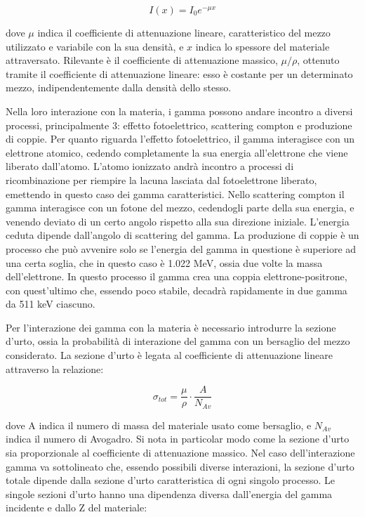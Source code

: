 \documentclass[a4paper,10pt]{article}
\begin{document}
\begin{equation}
	I(x)=I_{0}e^{-\mu x}
\end{equation}

\noindent dove $\mu$ indica il coefficiente di attenuazione lineare, caratteristico del mezzo utilizzato e variabile con la sua densità, e $x$ indica lo spessore del materiale attraversato. Rilevante \`e il coefficiente di attenuazione massico, $\mu/\rho$, ottenuto tramite il coefficiente di attenuazione lineare: esso \`e costante per un determinato mezzo, indipendentemente dalla densit\`a dello stesso. 

\noindent Nella loro interazione con la materia, i gamma possono andare incontro a diversi processi, principalmente 3: effetto fotoelettrico, scattering compton e produzione di coppie. Per quanto riguarda l'effetto fotoelettrico, il gamma interagisce con un elettrone atomico, cedendo completamente la sua energia all'elettrone che viene liberato dall'atomo. L'atomo ionizzato andr\`a incontro a processi di ricombinazione per riempire la lacuna lasciata dal fotoelettrone liberato, emettendo in questo caso dei gamma caratteristici. Nello scattering compton il gamma interagisce con un fotone del mezzo, cedendogli parte della sua energia, e venendo deviato di un certo angolo rispetto alla sua direzione iniziale. L'energia ceduta dipende dall'angolo di scattering del gamma. La produzione di coppie \`e un processo che pu\`o avvenire solo se l'energia del gamma in questione \`e superiore ad una certa soglia, che in questo caso \`e 1.022 MeV, ossia due volte la massa dell'elettrone. In questo processo il gamma crea una coppia elettrone-positrone, con quest'ultimo che, essendo poco stabile, decadr\`a rapidamente in due gamma da 511 keV ciascuno. 

\noindent Per l'interazione dei gamma con la materia \`e necessario introdurre la sezione d'urto, ossia la probabilit\`a di interazione del gamma con un bersaglio del mezzo considerato. La sezione d'urto \`e legata al coefficiente di attenuazione lineare attraverso la relazione:

\begin{equation}
	\sigma_{tot}=\frac{\mu}{\rho} \cdot \frac{A}{N_{Av}}
\end{equation}

\noindent dove A indica il numero di massa del materiale usato come bersaglio, e $N_{Av}$ indica il numero di Avogadro. Si nota in particolar modo come la sezione d'urto sia proporzionale al coefficiente di attenuazione massico. Nel caso dell'interazione gamma va sottolineato che, essendo possibili diverse interazioni, la sezione d'urto totale dipende dalla sezione d'urto caratteristica di ogni singolo processo. Le singole sezioni d'urto hanno una dipendenza diversa dall'energia del gamma incidente e dallo Z del materiale:
\end{document}
